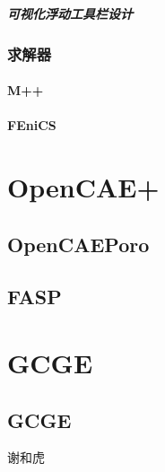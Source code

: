 \documentclass[letterpaper,10pt,english]{sphinxmanual}
\begin{document}
\paragraph{可视化浮动工具栏设计}
\label{\detokenize{src/fengsim/airfoil:id7}}

\subsection{求解器}
\label{\detokenize{src/fengsim/airfoil:id8}}

\subsubsection{M++}
\label{\detokenize{src/fengsim/airfoil:m}}

\subsubsection{FEniCS}
\label{\detokenize{src/fengsim/airfoil:fenics}}
\sphinxstepscope


\chapter{OpenCAE+}
\label{\detokenize{src/opencaeplus/main:opencae}}\label{\detokenize{src/opencaeplus/main::doc}}

\section{OpenCAEPoro}
\label{\detokenize{src/opencaeplus/main:opencaeporo}}

\section{FASP}
\label{\detokenize{src/opencaeplus/main:fasp}}
\sphinxstepscope


\chapter{GCGE}
\label{\detokenize{src/gcge/main:gcge}}\label{\detokenize{src/gcge/main::doc}}

\section{GCGE}
\label{\detokenize{src/gcge/main:id1}}
\sphinxAtStartPar
谢和虎

\sphinxstepscope
\end{document}
